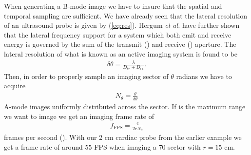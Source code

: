 When generating a B-mode image we have to insure that the spatial and temporal sampling are sufficient. We have already seen that the lateral resolution of an ultrasound probe is given by (\ref{eq:res}).  Hergum \textit{et al.} \cite{Hergum2009} have further shown that the lateral frequency support for a system which both emit and receive energy is governed by the sum of the transmit () and receive () aperture. The lateral resolution of what is known as an active imaging system is found to be
\begin{align}
\delta\theta = \frac{\lambda}{D_{tx} + D_{rx}}.
\end{align}
Then, in order to properly sample an imaging sector of $\theta$ radians we have to acquire 
\begin{align}
N_\theta = \frac{\theta}{\delta\theta}
\end{align}
A-mode images uniformly distributed across the sector. If  is the maximum range we want to image we get an imaging frame rate of
\begin{align}
f_{\text{FPS}} = \frac{c}{2rN_\theta}
\end{align} 
frames per second (). With our 2 cm cardiac probe from the earlier example we get a frame rate of around $55$ FPS when imaging a 70\degree{} sector with $r=15$ cm.

